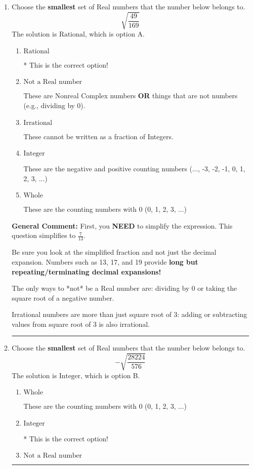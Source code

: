 \documentclass{extbook}[14pt]
\newcommand{\litem}[1]{\item #1

\rule{\textwidth}{0.4pt}}
\begin{document}
\begin{enumerate}\litem{
Choose the \textbf{smallest} set of Real numbers that the number below belongs to.
\[ \sqrt{\frac{49}{169}} \]The solution is \( \text{Rational} \), which is option A.\begin{enumerate}[label=\Alph*.]
\item \( \text{Rational} \)

* This is the correct option!
\item \( \text{Not a Real number} \)

These are Nonreal Complex numbers \textbf{OR} things that are not numbers (e.g., dividing by 0).
\item \( \text{Irrational} \)

These cannot be written as a fraction of Integers.
\item \( \text{Integer} \)

These are the negative and positive counting numbers (..., -3, -2, -1, 0, 1, 2, 3, ...)
\item \( \text{Whole} \)

These are the counting numbers with 0 (0, 1, 2, 3, ...)
\end{enumerate}

\textbf{General Comment:} First, you \textbf{NEED} to simplify the expression. This question simplifies to $\frac{7}{13}$. 
 
 Be sure you look at the simplified fraction and not just the decimal expansion. Numbers such as 13, 17, and 19 provide \textbf{long but repeating/terminating decimal expansions!} 
 
 The only ways to *not* be a Real number are: dividing by 0 or taking the square root of a negative number. 
 
 Irrational numbers are more than just square root of 3: adding or subtracting values from square root of 3 is also irrational.
}
\litem{
Choose the \textbf{smallest} set of Real numbers that the number below belongs to.
\[ -\sqrt{\frac{28224}{576}} \]The solution is \( \text{Integer} \), which is option B.\begin{enumerate}[label=\Alph*.]
\item \( \text{Whole} \)

These are the counting numbers with 0 (0, 1, 2, 3, ...)
\item \( \text{Integer} \)

* This is the correct option!
\item \( \text{Not a Real number} \)


\end{enumerate}}
\end{enumerate}
\end{document}
